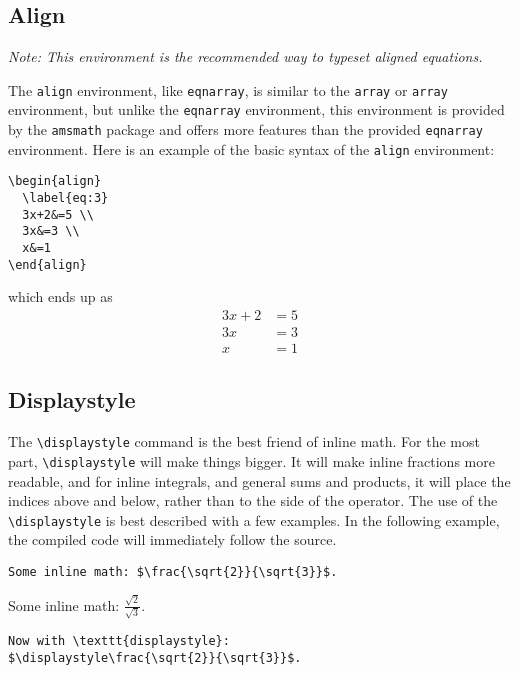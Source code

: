 \subsection{Align}
\label{sec:align}

\emph{Note: This environment is the recommended way to typeset
  aligned equations.}

The \texttt{align} environment, like \texttt{eqnarray}, is similar to
the \texttt{array} or \texttt{array} environment, but unlike the
\texttt{eqnarray} environment, this environment is provided by the
\texttt{amsmath} package and offers more features than the provided
\texttt{eqnarray} environment.  Here is an example of the basic syntax
of the \texttt{align} environment:
\begin{verbatim}
\begin{align}
  \label{eq:3}
  3x+2&=5 \\
  3x&=3 \\
  x&=1
\end{align}
\end{verbatim}
which ends up as
\begin{align}
  \label{eq:3}
  3x+2&=5 \\
  3x&=3 \\
  x&=1
\end{align}

\subsection{Displaystyle}
\label{sec:displaystyle}

The \verb|\displaystyle| command is the best friend of inline math.
For the most part, \verb|\displaystyle| will make things bigger.  It
will make inline fractions more readable, and for inline integrals,
and general sums and products, it will place the indices above and
below, rather than to the side of the operator.  The use of the
\verb|\displaystyle| is best described with a few examples.  In the
following example, the compiled code will immediately follow the source.
\begin{verbatim}
Some inline math: $\frac{\sqrt{2}}{\sqrt{3}}$.
\end{verbatim}

Some inline math: $\frac{\sqrt{2}}{\sqrt{3}}$.

\begin{verbatim}
Now with \texttt{displaystyle}:
$\displaystyle\frac{\sqrt{2}}{\sqrt{3}}$.
\end{verbatim}

